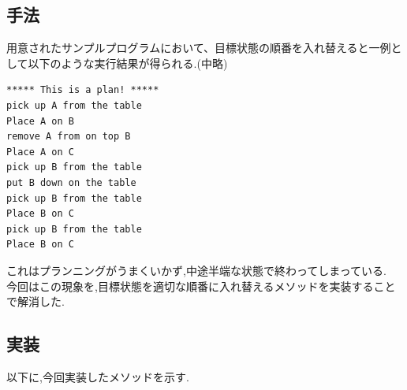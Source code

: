 \documentclass[uplatex,12pt]{jsarticle}
\begin{document}
\subsection{手法}
用意されたサンプルプログラムにおいて、目標状態の順番を入れ替えると一例として以下のような実行結果が得られる.(中略)
\begin{lstlisting}[caption=正しくない動作例, label=mid]
***** This is a plan! *****
pick up A from the table
Place A on B
remove A from on top B
Place A on C
pick up B from the table
put B down on the table
pick up B from the table
Place B on C
pick up B from the table
Place B on C
\end{lstlisting}
​これはプランニングがうまくいかず,中途半端な状態で終わってしまっている.\\
今回はこの現象を,目標状態を適切な順番に入れ替えるメソッドを実装することで解消した.

\subsection{実装}
以下に,今回実装したメソッドを示す.\\
\end{document}

